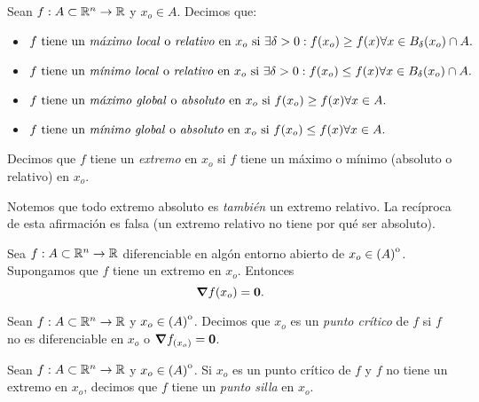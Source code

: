 \label{sec:extremos}

\begin{definition}  \label{def:extremos}
 \mbox{}
 
 Sean $f: A \subset \mathbb {R}^n \to \mathbb{R}$ y $x_o \in A$. Decimos que:
 \begin{itemize}
  \item $f \text{ tiene un \emph{m\'aximo local} o \emph{relativo} en } x_o \text{ si } \exists \delta > 0 : f(x_o) \ge f(x) \forall x \in B_{\delta}(x_o) \cap A.$ 
  \item $f \text{ tiene un \emph{m\'inimo local} o \emph{relativo} en } x_o \text{ si } \exists \delta > 0 : f(x_o) \le f(x) \forall x \in B_{\delta}(x_o) \cap A.$
  \item $f \text{ tiene un \emph{m\'aximo global} o \emph{absoluto} en } x_o \text{ si } f(x_o) \ge f(x) \forall x \in A.$ 
  \item $f \text{ tiene un \emph{m\'inimo global} o \emph{absoluto} en } x_o \text{ si } f(x_o) \le f(x) \forall x \in A.$
 \end{itemize}
 Decimos que $f$ tiene un \emph{extremo} en $x_o$ si $f$ tiene un m\'aximo o m\'inimo (absoluto o relativo) en $x_o$.
 \begin{obs}
  Notemos que todo extremo absoluto es \emph{tambi\'en} un extremo relativo. La rec\'iproca de esta afirmaci\'on es falsa (un extremo relativo no tiene por qu\'e ser absoluto).
 \end{obs}
\end{definition}

\begin{theorem} \label{teo:grad_nulo}
 Sea $f: A \subset \mathbb {R}^n \to \mathbb{R}$ diferenciable en alg\'on entorno abierto de $x_o \in {\kern0pt(A)}^{\mathrm{o}}$. Supongamos que $f$ tiene un extremo en $x_o$. Entonces
 \[
  \grad f(x_o) = \mathbf{0}.
 \]
\end{theorem}

\begin{definition}  \label{def:pto_crit}
 Sean $f: A \subset \mathbb {R}^n \to \mathbb{R}$ y $x_o \in {\kern0pt(A)}^{\mathrm{o}}$. Decimos que $x_o$ es un \emph{punto cr\'itico} de $f$ si $f$ no es diferenciable en $x_o$ o $\grad f_{(x_o)} = \mathbf{0}$.
\end{definition}

\begin{definition}  \label{def:pto_silla}
 Sean $f: A \subset \mathbb {R}^n \to \mathbb{R}$ y $x_o \in {\kern0pt(A)}^{\mathrm{o}}$. Si $x_o$ es un punto cr\'itico de $f$ y $f$ no tiene un extremo en $x_o$, decimos que $f$ tiene un \emph{punto silla} en $x_o$.
\end{definition}


